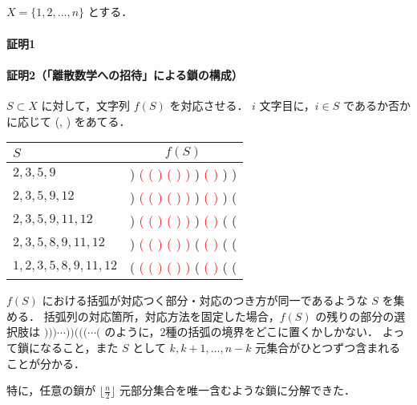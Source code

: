 \subsection{}
$X = \{1,2,\ldots,n\}$ とする．

\paragraph*{証明1}

\paragraph*{証明2（「離散数学への招待」による鎖の構成）}
$S\subset X$ に対して，文字列 $f(S)$ を対応させる．
$i$ 文字目に，$i\in S$ であるか否かに応じて (, ) をあてる．

\begin{tabular}{|l|c|}
\hline
$S$ & $f(S)$ \\\hline
$2,3,5,9$ & ) \textcolor{red}{( ( ) ( ) )} ) \textcolor{red}{( )} ) )\\\hline
$2,3,5,9,12$ &  ) \textcolor{red}{( ( ) ( ) )} ) \textcolor{red}{( )} ) (\\\hline
$2,3,5,9,11,12$ &  ) \textcolor{red}{( ( ) ( ) )} ) \textcolor{red}{( )} ( (\\\hline
$2,3,5,8,9,11,12$ &  ) \textcolor{red}{( ( ) ( ) )} ( \textcolor{red}{( )} ( (\\\hline
$1,2,3,5,8,9,11,12$ &  ( \textcolor{red}{( ( ) ( ) )} ( \textcolor{red}{( )} ( (\\\hline
\end{tabular}

$f(S)$ における括弧が対応つく部分・対応のつき方が同一であるような $S$ を集める．
括弧列の対応箇所，対応方法を固定した場合，$f(S)$ の残りの部分の選択肢は $)))\cdots ))(((\cdots ($ のように，2種の括弧の境界をどこに置くかしかない．
よって鎖になること，また $S$ として $k, k+1, \ldots, n-k$ 元集合がひとつずつ含まれることが分かる．

特に，任意の鎖が $\lfloor \frac{n}{2}\rfloor$ 元部分集合を唯一含むような鎖に分解できた．